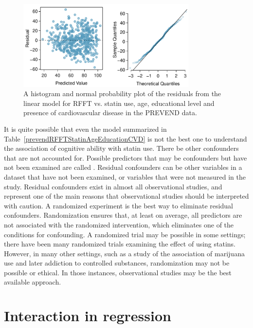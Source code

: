 \begin{figure}[h!]
	\centering
	\includegraphics[width=0.8\textwidth]
	{ch_multiple_linear_regression_oi_biostat/figures/prevendRFFTStatinAgeEducCVDResidNormPlot/prevendRFFTStatinAgeEducCVDResidNormPlot.pdf}
	\caption{A histogram and normal probability plot of the residuals from the linear model for RFFT vs. statin use, age, educational level and presence of cardiovascular disease in the PREVEND data.}
	\label{prevendRFFTStatinAgeEducCVDResidNormPlot}
\end{figure}

It is quite possible that even the model summarized in Table~\ref{prevendRFFTStatinAgeEducationCVD} is not the best one to understand the association of cognitive ability with statin use. There be other confounders that are not accounted for.  Possible predictors that may be confounders but have not been examined are called .  Residual confounders can be other variables in a dataset that have not been examined, or variables that were not measured in the study.  Residual confounders exist in almost all observational studies, and represent one of the main reasons that observational studies should be interpreted with caution. A randomized experiment is the best way to eliminate residual confounders. Randomization ensures that, at least on average, all predictors are not associated with the randomized intervention, which eliminates one of the conditions for confounding.  A randomized trial may be possible in some settings; there have been many randomized trials examining the effect of using statins. However, in many other settings, such as a study of the association of marijuana use and later addiction to controlled substances, randomization may not be possible or ethical.  In those instances, observational studies may be the best available approach.

\section{Interaction in regression}
\label{interactionRegression}

